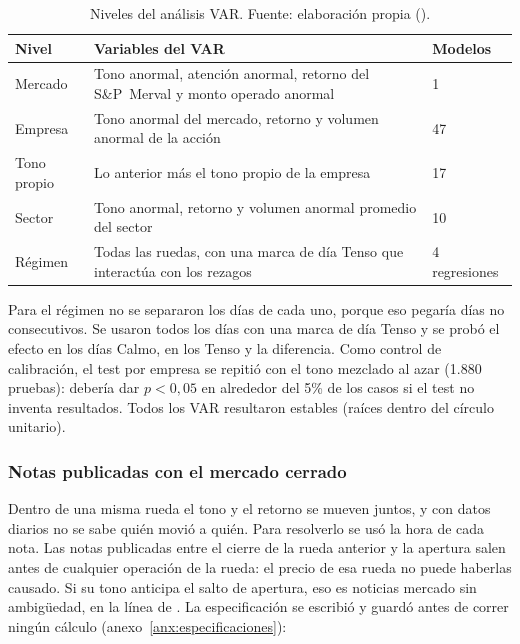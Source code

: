 \begin{table}[H]
\centering\small
\begin{tabularx}{\linewidth}{@{}L{2.4cm}YC{1.8cm}@{}}
\toprule
\textbf{Nivel} & \textbf{Variables del VAR} & \textbf{Modelos} \\
\midrule
Mercado & Tono anormal, atención anormal, retorno del S\&P~Merval y monto operado anormal & 1 \\
Empresa & Tono anormal del mercado, retorno y volumen anormal de la acción & 47 \\
Tono propio & Lo anterior más el tono propio de la empresa & 17 \\
Sector & Tono anormal, retorno y volumen anormal promedio del sector & 10 \\
Régimen & Todas las ruedas, con una marca de día Tenso que interactúa con los rezagos & 4 regresiones \\
\bottomrule
\end{tabularx}
\caption{Niveles del análisis VAR. Fuente: elaboración propia ().}
\label{tab:niveles-var}
\end{table}

Para el régimen no se separaron los días de cada uno, porque eso pegaría días no
consecutivos. Se usaron todos los días con una marca de día Tenso y se probó el efecto en los
días Calmo, en los Tenso y la diferencia. Como control de calibración, el test por empresa se
repitió con el tono mezclado al azar (1.880 pruebas): debería dar $p<0{,}05$ en alrededor del
5\% de los casos si el test no inventa resultados. Todos los VAR resultaron estables (raíces
dentro del círculo unitario).

\subsubsection{Notas publicadas con el mercado cerrado}

Dentro de una misma rueda el tono y el retorno se mueven juntos, y con datos diarios no se
sabe quién movió a quién. Para resolverlo se usó la hora de cada nota. Las notas publicadas
entre el cierre de la rueda anterior y la apertura salen antes de cualquier operación de la
rueda: el precio de esa rueda no puede haberlas causado. Si su tono anticipa el salto de
apertura, eso es noticias \flecha{} mercado sin ambigüedad, en la línea de
\citet{glasserman2025}. La especificación se escribió y guardó antes de correr ningún cálculo
(anexo~\ref{anx:especificaciones}):

